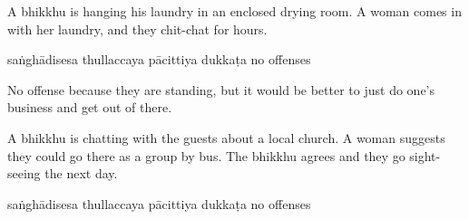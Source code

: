 \begin{exam}{\autoExamName}
\begin{problem*}
\begin{parts}
  \bigskip

\item A bhikkhu is hanging his laundry in an enclosed drying room. A woman comes in with
  her laundry, and they chit-chat for hours.

  \bigskip

  \begin{answers}{5}
    \bChoices
     saṅghādisesa\eAns
     thullaccaya\eAns
     pācittiya\eAns
     dukkaṭa\eAns
     no offenses\eAns
    \eChoices
  \end{answers}

  \begin{solution}
    No offense because they are standing, but it would be better to just do
    one's business and get out of there.
  \end{solution}

  \bigskip

\item A bhikkhu is chatting with the guests about a local church. A woman
  suggests they could go there as a group by bus. The bhikkhu agrees and they go
  sight-seeing the next day.

  \bigskip

  \begin{answers}{5}
    \bChoices
     saṅghādisesa\eAns
     thullaccaya\eAns
     pācittiya\eAns
     dukkaṭa\eAns
     no offenses\eAns
    \eChoices
  \end{answers}

\end{parts}

\end{problem*}

\end{exam}
